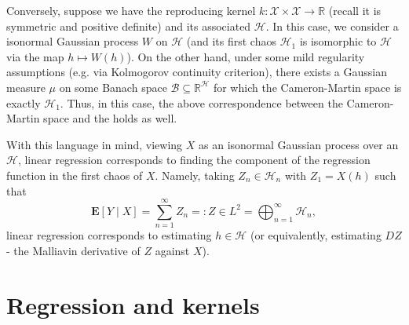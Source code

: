 \documentclass[a4paper, 11pt]{style/preprint}
\begin{document}
Conversely, suppose we have the reproducing kernel \(k : \mathcal{X} \times \mathcal{X} \to \mathbb{R}\) 
(recall it is symmetric and positive definite) and its associated \RKHS{} \(\mathcal{H}\). In this case, 
we consider a isonormal Gaussian process \(W\) on \(\mathcal{H}\) (and its first chaos 
\(\mathcal{H}_1\) is isomorphic to \(\mathcal{H}\) via the map \(h \mapsto W(h)\)). On the other hand, 
under some mild regularity assumptions (e.g. via Kolmogorov continuity criterion), there exists a 
Gaussian measure \(\mu\) on some Banach space \(\mathcal{B} \subseteq \mathbb{R}^\mathcal{H}\) 
for which the Cameron-Martin space is exactly \(\mathcal{H}_1\). Thus, in this case, the above 
correspondence between the Cameron-Martin space and the \RKHS{} holds as well. 

With this language in mind, viewing \(X\) as an isonormal Gaussian process over an \RKHS{} \(\mathcal{H}\),
linear regression corresponds to finding the component of the regression function 
in the first chaos of \(X\). Namely, taking \(Z_n \in \mathcal{H}_n\) with \(Z_1 = X(h)\) such that
\[\mathbf{E}[Y \mid X] = \sum_{n = 1}^\infty Z_n =: Z \in L^2 = \bigoplus_{n=1}^\infty \mathcal{H}_n,\] 
linear regression corresponds to estimating \(h \in \mathcal{H}\) (or equivalently, estimating \(DZ\) 
- the Malliavin derivative of \(Z\) against \(X\)).


\section*{Regression and kernels}
\end{document}
